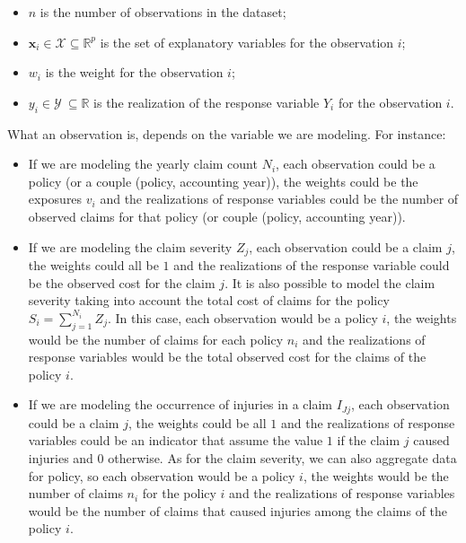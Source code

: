 \documentclass[a4paper, twoside, openright, 12pt]{report}
\providecommand{\tightlist}{%
  \setlength{\itemsep}{0pt}\setlength{\parskip}{0pt}}
\theoremstyle{definition}
\theoremstyle{definition}
\theoremstyle{definition}
\theoremstyle{remark}
\begin{document}
\begin{itemize}
\tightlist
\item
  \(n\) is the number of observations in the dataset;
\item
  \(\boldsymbol{x}_i\in \mathcal{X} \subseteq \mathbb{R}^p\) is the set of explanatory variables for the observation \(i\);
\item
  \(w_i\) is the weight for the observation \(i\);
\item
  \(y_i\in \mathcal{Y}\ \subseteq \mathbb{R}\) is the realization of the response variable \(Y_i\) for the observation \(i\).
\end{itemize}

What an observation is, depends on the variable we are modeling. For instance:

\begin{itemize}
\tightlist
\item
  If we are modeling the yearly claim count \(N_i\), each observation could be a policy (or a couple (policy, accounting year)), the weights could be the exposures \(v_i\) and the realizations of response variables could be the number of observed claims for that policy (or couple (policy, accounting year)).
\item
  If we are modeling the claim severity \(Z_j\), each observation could be a claim \(j\), the weights could all be \(1\) and the realizations of the response variable could be the observed cost for the claim \(j\). It is also possible to model the claim severity taking into account the total cost of claims for the policy \(S_i = \sum_{j=1}^{N_i}{Z_j}\). In this case, each observation would be a policy \(i\), the weights would be the number of claims for each policy \(n_i\) and the realizations of response variables would be the total observed cost for the claims of the policy \(i\).
\item
  If we are modeling the occurrence of injuries in a claim \(I_{Jj}\), each observation could be a claim \(j\), the weights could be all \(1\) and the realizations of response variables could be an indicator that assume the value \(1\) if the claim \(j\) caused injuries and \(0\) otherwise. As for the claim severity, we can also aggregate data for policy, so each observation would be a policy \(i\), the weights would be the number of claims \(n_i\) for the policy \(i\) and the realizations of response variables would be the number of claims that caused injuries among the claims of the policy \(i\).
\end{itemize}
\end{document}
